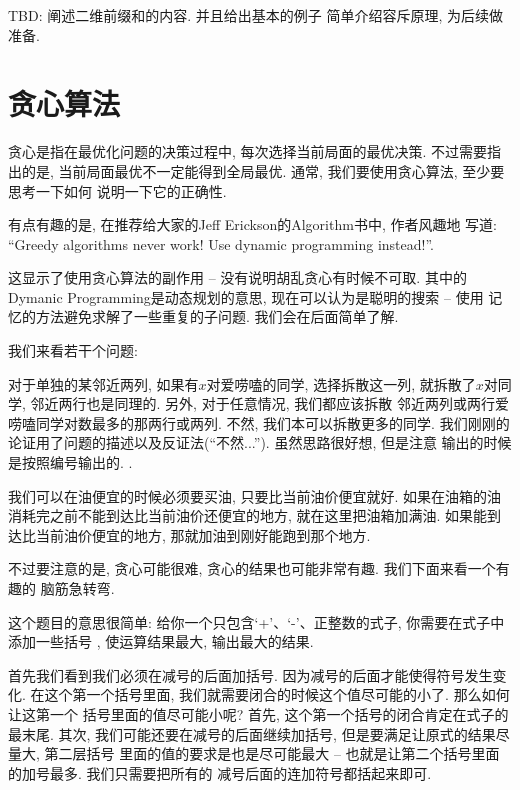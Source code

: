  TBD: 阐述二维前缀和的内容. 并且给出基本的例子
简单介绍容斥原理, 为后续做准备. 

\section{贪心算法}

贪心是指在最优化问题的决策过程中, 每次选择当前局面的最优决策. 不过需要指出的是, 
当前局面最优不一定能得到全局最优. 通常, 我们要使用贪心算法, 至少要思考一下如何
说明一下它的正确性. 

\begin{remark}
    有点有趣的是, 在推荐给大家的Jeff Erickson的Algorithm书中, 作者风趣地
    写道: ``Greedy algorithms never work! Use dynamic programming instead!''.

    这显示了使用贪心算法的副作用 -- 没有说明胡乱贪心有时候不可取. 其中的 
    Dymanic Programming是动态规划的意思, 现在可以认为是聪明的搜索 -- 使用
    记忆的方法避免求解了一些重复的子问题. 我们会在后面简单了解. 
\end{remark}

我们来看若干个问题: 

 对于单独的某邻近两列, 如果有$x$对爱唠嗑的同学, 选择拆散这一列, 
就拆散了$x$对同学, 邻近两行也是同理的. 另外, 对于任意情况, 我们都应该拆散
邻近两列或两行爱唠嗑同学对数最多的那两行或两列. 不然, 我们本可以拆散更多的同学. 
我们刚刚的论证用了问题的描述以及反证法(``不然...''). 虽然思路很好想, 但是注意
输出的时候是按照编号输出的. . 

 我们可以在油便宜的时候必须要买油, 只要比当前油价便宜就好. 
如果在油箱的油消耗完之前不能到达比当前油价还便宜的地方, 就在这里把油箱加满油. 
如果能到达比当前油价便宜的地方, 那就加油到刚好能跑到那个地方. 



不过要注意的是, 贪心可能很难, 贪心的结果也可能非常有趣. 我们下面来看一个有趣的
脑筋急转弯. 

这个题目的意思很简单: 给你一个只包含`+'、`-'、正整数的式子, 你需要在式子中添加一些括号
, 使运算结果最大, 输出最大的结果. 

首先我们看到我们必须在减号的后面加括号. 因为减号的后面才能使得符号发生变化. 
在这个第一个括号里面, 我们就需要闭合的时候这个值尽可能的小了. 那么如何让这第一个
括号里面的值尽可能小呢? 首先, 这个第一个括号的闭合肯定在式子的最末尾. 
其次, 我们可能还要在减号的后面继续加括号, 但是要满足让原式的结果尽量大, 第二层括号
里面的值的要求是也是尽可能最大 -- 也就是让第二个括号里面的加号最多. 我们只需要把所有的
减号后面的连加符号都括起来即可. 

